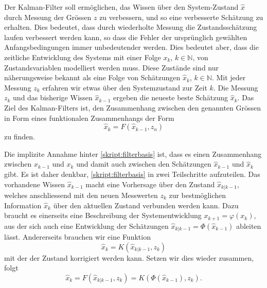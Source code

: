 Der Kalman-Filter soll ermöglichen, das Wissen über den System-Zustand
$\hat x$ durch Messung der Grössen $z$ zu verbessern, und so eine
verbesserte Schätzung zu erhalten.
Dies bedeutet, dass durch wiederholte Messung die Zustandsschätzung
laufen verbessert werden kann, so dass die Fehler der ursprünglich gewählten 
Anfangsbedingungen immer unbedeutender werden.
Dies bedeutet aber, dass die zeitliche Entwicklung des Systems mit einer Folge
$x_k$, $k\in\mathbb N$, von Zustandsvariablen modelliert werden muss.
Diese Zustände sind nur näherungsweise bekannt als eine Folge
von Schätzungen $\hat{x}_k$, $k\in\mathbb N$.
Mit jeder Messung $z_k$ erfahren wir etwas über den Systemzustand
zur Zeit $k$.
Die Messung $z_k$ und das bisherige Wissen $\hat{x}_{k-1}$ ergeben
die neueste beste Schätzung $\hat{x}_k$.
Das Ziel des Kalman-Filters ist, den Zusammenhang zwischen den
genannten Grössen in Form eines funktionalen Zusammenhangs der Form
\begin{equation}
\hat{x}_k = F(\hat{x}_{k-1},z_n)
\label{skript:filterbasis}
\end{equation}
zu finden.

Die implizite Annahme hinter \eqref{skript:filterbasis} ist,
dass es einen Zusammenhang zwischen $x_{k-1}$ und $x_k$ und damit auch
zwischen den Schätzungen $\hat{x}_{k-1}$ und $\hat{x}_k$ gibt.
Es ist daher denkbar, \eqref{skript:filterbasis} in zwei Teilschritte
aufzuteilen.
Das vorhandene Wissen $\hat{x}_{k-1}$ macht eine Vorhersage über den
Zustand $\hat{x}_{k|k-1}$, welches anschliessend mit den neuen 
Messwerten $z_k$ zur bestmöglichen Information $\hat{x}_k$ über den
aktuellen Zustand verbunden werden kann.
Dazu braucht es einerseits eine Beschreibung der Systementwicklung
$x_{k+1} = \varphi(x_k)$, aus der sich auch eine Entwicklung der
Schätzungen $\hat{x}_{k|k-1} = \Phi(\hat{x}_{k-1})$ ableiten lässt.
Andererseits brauchen wir eine Funktion
\begin{equation}
\hat{x}_k = K(\hat{x}_{k|k-1}, z_k)
\end{equation}
mit der der Zustand korrigiert werden kann.
Setzen wir dies wieder zusammen, folgt
\[
\hat{x}_k
=
F(\hat{x}_{k|k-1},z_k)
=
K(\Phi(\hat{x}_{k-1}),z_k).
\]


